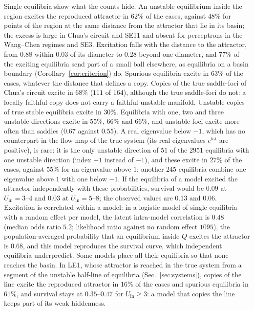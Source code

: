 \documentclass[aip,cha,reprint,amsmath,amssymb,longbibliography]{revtex4-2}
\theoremstyle{definition}
\newcommand{\Uin}{U_{\mathrm{in}}}
\begin{document}
Single equilibria show what the counts hide. An unstable equilibrium inside the region excites the reproduced attractor in
$62\%$ of the cases, against $48\%$ for points of the region at the same distance from the attractor that lie in its basin;
the excess is large in Chua's circuit and SE11 and absent for perceptrons in the Wang--Chen regimes and SE3. Excitation
falls with the distance to the attractor, from $0.88$ within $0.03$ of its diameter to $0.28$ beyond one diameter, and
$77\%$ of the exciting equilibria send part of a small ball elsewhere, as equilibria on a basin boundary
(Corollary~\ref{cor:criterion}) do. Spurious equilibria excite in $63\%$ of the cases, whatever the distance that defines a
copy. Copies of the true saddle-foci of Chua's circuit excite in $68\%$ ($111$ of $164$), although the true saddle-foci do
not: a locally faithful copy does not carry a faithful unstable manifold. Unstable copies of true stable equilibria excite
in $30\%$. Equilibria with one, two and three unstable directions excite in $55\%$, $66\%$ and $66\%$, and unstable foci
excite more often than saddles ($0.67$ against $0.55$). A real eigenvalue below $-1$, which has no counterpart in the flow map of the
true system (its real eigenvalues $e^{h\lambda}$ are positive), is rare: it is the only unstable direction of $51$ of the
$2951$ equilibria with one unstable direction (index $+1$ instead of $-1$), and these excite in $27\%$ of the cases, against
$55\%$ for an eigenvalue above $1$; another $245$ equilibria combine one eigenvalue above $1$ with one below $-1$. If the
equilibria of a model excited the attractor independently with these probabilities, survival would be $0.09$ at
$\Uin=3$--$4$ and $0.03$ at $\Uin=5$--$8$; the observed values are $0.13$ and $0.06$. Excitation is correlated within a
model: in a logistic model of single equilibria with a random effect per model, the latent intra-model correlation is
$0.48$ (median odds ratio $5.2$; likelihood ratio against no random effect $1095$), the population-averaged probability that
an equilibrium inside $Q$ excites the attractor is $0.68$, and this model reproduces the survival curve, which independent
equilibria underpredict. Some models place all their equilibria so that none reaches the basin. In LE1, whose attractor is reached in the true system from a segment of the unstable half-line
of equilibria (Sec.~\ref{sec:systems}), copies of the line excite the reproduced attractor in $16\%$ of the cases and
spurious equilibria in $61\%$, and survival stays at $0.35$--$0.47$ for $\Uin\ge3$: a model that copies the line keeps
part of its weak hiddenness.
\end{document}
